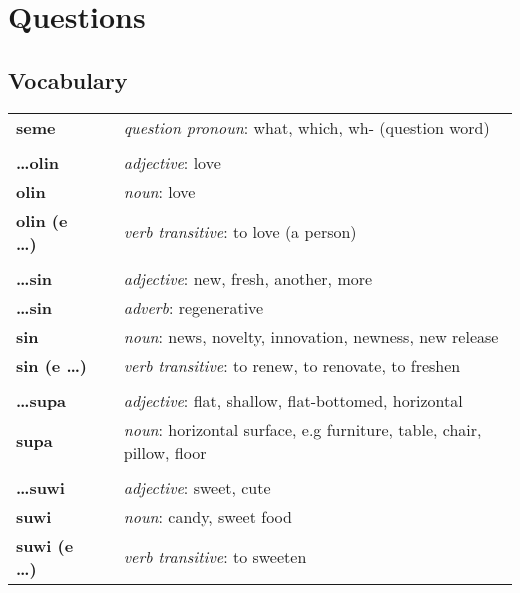 \section{Questions}
\subsection*{Vocabulary}
%
% 
%
\begin{supertabular}{p{2,5cm}|ll}
\textbf{seme} && \textit{question pronoun}: what, which, wh- (question word) \\ %
 && \\ %
\textbf{\dots olin} && \textit{adjective}: love \\ %
\textbf{olin} && \textit{noun}: love \\ %
\textbf{olin (e \dots)} && \textit{verb transitive}: to love (a person) \\ %
 && \\ %
\textbf{\dots sin} && \textit{adjective}: new, fresh, another, more \\ %
\textbf{ \dots sin } && \textit{adverb}: regenerative \\ %
\textbf{sin} && \textit{noun}: news, novelty, innovation, newness, new release \\ %
\textbf{sin (e \dots)} && \textit{verb transitive}: to renew, to renovate, to freshen \\ %
 && \\ %
\textbf{\dots supa} && \textit{adjective}: flat, shallow, flat-bottomed, horizontal \\ %
\textbf{supa} && \textit{noun}: horizontal surface, e.g furniture, table, chair, pillow, floor \\ %
 && \\ %
\textbf{\dots suwi} && \textit{adjective}: sweet, cute \\ %
\textbf{suwi} && \textit{noun}: candy, sweet food \\ %
\textbf{suwi (e \dots)} && \textit{verb transitive}: to sweeten \\ %
\end{supertabular} \\
%
\newpage
{}
